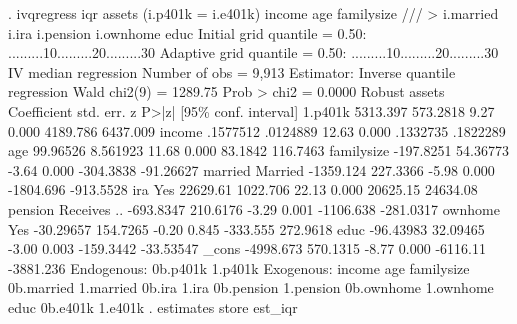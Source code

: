 . ivqregress iqr assets (i.p401k = i.e401k) income age familysize         ///
>         i.married i.ira i.pension i.ownhome educ
{\smallskip}
Initial grid
    quantile = 0.50: .........10.........20.........30
{\smallskip}
Adaptive grid
    quantile = 0.50: .........10.........20.........30
{\smallskip}
IV median regression                                   Number of obs =   9,913
Estimator: Inverse quantile regression                 Wald chi2(9)  = 1289.75
                                                       Prob > chi2   =  0.0000
{\smallskip}
             {\VBAR}               Robust
      assets {\VBAR} Coefficient  std. err.      z    P>|z|     [95\% conf. interval]
     1.p401k {\VBAR}   5313.397   573.2818     9.27   0.000     4189.786    6437.009
      income {\VBAR}   .1577512   .0124889    12.63   0.000     .1332735    .1822289
         age {\VBAR}   99.96526   8.561923    11.68   0.000      83.1842    116.7463
  familysize {\VBAR}  -197.8251   54.36773    -3.64   0.000    -304.3838   -91.26627
             {\VBAR}
     married {\VBAR}
    Married  {\VBAR}  -1359.124   227.3366    -5.98   0.000    -1804.696   -913.5528
             {\VBAR}
         ira {\VBAR}
        Yes  {\VBAR}   22629.61   1022.706    22.13   0.000     20625.15    24634.08
             {\VBAR}
     pension {\VBAR}
Receives ..  {\VBAR}  -693.8347   210.6176    -3.29   0.001    -1106.638   -281.0317
             {\VBAR}
     ownhome {\VBAR}
        Yes  {\VBAR}  -30.29657   154.7265    -0.20   0.845     -333.555    272.9618
        educ {\VBAR}  -96.43983   32.09465    -3.00   0.003    -159.3442   -33.53547
       _cons {\VBAR}  -4998.673   570.1315    -8.77   0.000     -6116.11   -3881.236
Endogenous: 0b.p401k 1.p401k
 Exogenous: income age familysize 0b.married 1.married 0b.ira 1.ira
            0b.pension 1.pension 0b.ownhome 1.ownhome educ 0b.e401k 1.e401k
{\smallskip}
. estimates store est_iqr
